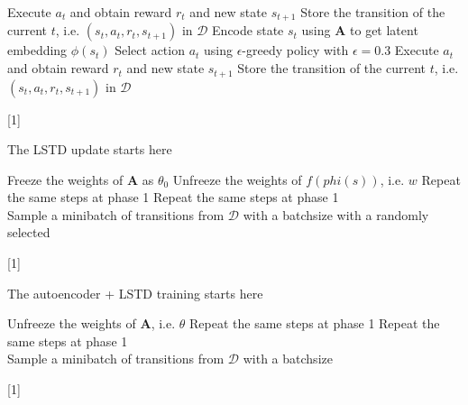 \documentclass[a4paper,12pt,oneside]{article}
\numberwithin{equation}{section}
\begin{document}
\begin{algorithm}
\begin{algorithmic}[1]
                \State Execute $a_t$ and obtain reward $r_t$ and new state $s_{t+1}$
                \State Store the transition of the current \(t\), i.e. $(s_t, a_t, r_t, s_{t+1})$ in $\mathcal{D}$
                \State Encode state \(s_t\) using $\mathbf{A}$ to get latent embedding $\phi(s_t)$
                \State Select action $a_t$ using $\epsilon$-greedy policy with $\epsilon=0.3$
                \State Execute $a_t$ and obtain reward $r_t$ and new state $s_{t+1}$
                \State Store the transition of the current \(t\), i.e. $(s_t, a_t, r_t, s_{t+1})$ in $\mathcal{D}$
            \EndFor
        \EndFor
        \end{algorithmic}[1]
    \end{algorithm}
    
    \clearpage
    \begin{algorithm}
    \caption{The LSTD update starts here}
        \begin{algorithmic}[1]
        \State Freeze the weights of $\mathbf{A}$ as $\theta_0$
        \State Unfreeze the weights of \(f(phi(s))\), i.e. \(w\)
            \State Repeat the same steps at phase 1
                \State Repeat the same steps at phase 1
                \\
                \State Sample a minibatch of transitions from $\mathcal{D}$ with a batchsize with a randomly selected  \

            \EndFor
        \EndFor
        \end{algorithmic}[1]
    \end{algorithm}

    \clearpage
    \begin{algorithm}
    \caption{The autoencoder + LSTD training starts here}
        \begin{algorithmic}[1]
        \State Unfreeze the weights of $\mathbf{A}$, i.e. $\theta$
            \State Repeat the same steps at phase 1
                \State Repeat the same steps at phase 1
                \\
                \State Sample a minibatch of transitions from $\mathcal{D}$ with a batchsize \
            \EndFor
        \EndFor
        \end{algorithmic}[1]    
    \end{algorithm}
\end{document}
